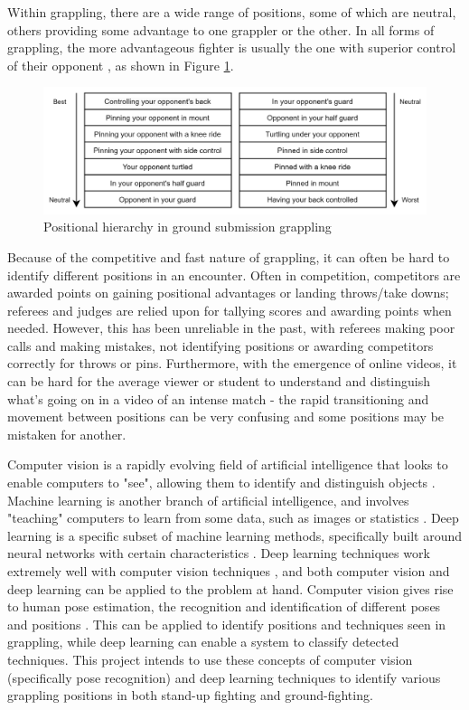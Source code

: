 \documentclass[a4paper, oneside, 11pt]{article}
\begin{document}
Within grappling, there are a wide range of positions, some of which are neutral, others providing some advantage to one grappler or the other. In all forms of grappling, the more advantageous fighter is usually the one with superior control of their opponent \cite{ribeiro2008jiu}, as shown in Figure \ref{fig:grapplingpositions}.


\begin{figure}[h]
    \centering
    \includegraphics[scale = 0.15]{img/Grappling positions.drawio (1).png}
    \caption{Positional hierarchy in ground submission grappling}
    \label{fig:grapplingpositions}
\end{figure}

Because of the competitive and fast nature of grappling, it can often be hard to identify different positions in an encounter. Often in competition, competitors are awarded points on gaining positional advantages or landing throws/take downs; referees and judges are relied upon for tallying scores and awarding points when needed. However, this has been unreliable in the past, with referees making poor calls and making mistakes, not identifying positions or awarding competitors correctly for throws or pins. Furthermore, with the emergence of online videos, it can be hard for the average viewer or student to understand and distinguish what's going on in a video of an intense match - the rapid transitioning and movement between positions can be very confusing and some positions may be mistaken for another.

Computer vision is a rapidly evolving field of artificial intelligence that looks to enable computers to "see", allowing them to identify and distinguish objects \cite{DefineComputerVision}. Machine learning is another branch of artificial intelligence, and involves "teaching" computers to learn from some data, such as images or statistics \cite{nielsen2015neural}. Deep learning is a specific subset of machine learning methods, specifically built around neural networks with certain characteristics \cite{nielsen2015neural}. Deep learning techniques work extremely well with computer vision techniques \cite{ComputerVisionAndDeepLearning}, and both computer vision and deep learning can be applied to the problem at hand. Computer vision gives rise to human pose estimation, the recognition and identification of different poses and positions \cite{DefineHumanPoseEstimation}. This can be applied to identify positions and techniques seen in grappling, while deep learning can enable a system to classify detected techniques. This project intends to use these concepts of computer vision (specifically pose recognition) and deep learning techniques to identify various grappling positions in both stand-up fighting and ground-fighting.
\end{document}

